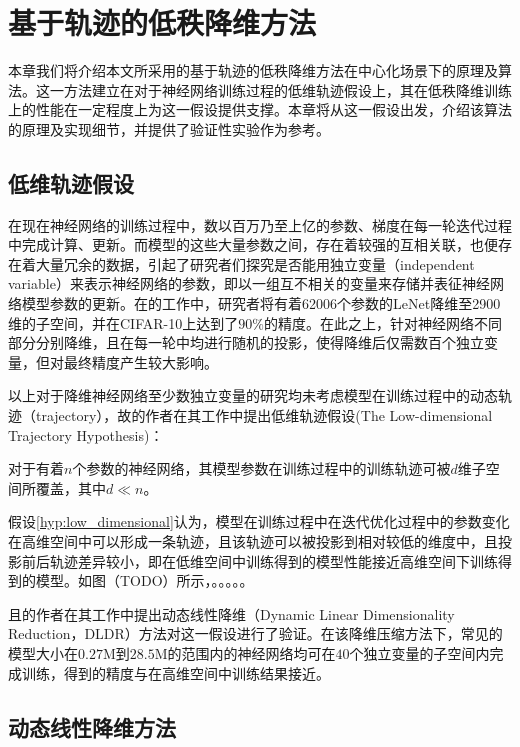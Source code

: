 \chapter{基于轨迹的低秩降维方法}

本章我们将介绍本文所采用的基于轨迹的低秩降维方法在中心化场景下的原理及算法。这一方法建立在对于神经网络训练过程的低维轨迹假设\cite{li2022low}上，其在低秩降维训练上的性能在一定程度上为这一假设提供支撑。本章将从这一假设出发，介绍该算法的原理及实现细节，并提供了验证性实验作为参考。

\section{低维轨迹假设}

在现在神经网络的训练过程中，数以百万乃至上亿的参数、梯度在每一轮迭代过程中完成计算、更新。而模型的这些大量参数之间，存在着较强的互相关联，也便存在着大量冗余的数据，引起了研究者们探究是否能用独立变量（independent variable）来表示神经网络的参数，即以一组互不相关的变量来存储并表征神经网络模型参数的更新。在\parencite{li2018measuring}的工作中，研究者将有着62006个参数的LeNet\cite{lecun2015lenet}降维至2900维的子空间，并在CIFAR-10\cite{krizhevsky2009learning}上达到了$90\%$的精度。在此之上，\parencite{gressmann2020improving}针对神经网络不同部分分别降维，且在每一轮中均进行随机的投影，使得降维后仅需数百个独立变量，但对最终精度产生较大影响。

以上对于降维神经网络至少数独立变量的研究均未考虑模型在训练过程中的动态轨迹（trajectory），故\parencite{li2022low}的作者在其工作中提出低维轨迹假设(The Low-dimensional Trajectory Hypothesis)：
\begin{hyp}[低维轨迹假设]\label{hyp:low_dimensional}
    对于有着$n$个参数的神经网络，其模型参数在训练过程中的训练轨迹可被$d$维子空间所覆盖，其中$d \ll n$。
\end{hyp}

假设\ref{hyp:low_dimensional}认为，模型在训练过程中在迭代优化过程中的参数变化在高维空间中可以形成一条轨迹，且该轨迹可以被投影到相对较低的维度中，且投影前后轨迹差异较小，即在低维空间中训练得到的模型性能接近高维空间下训练得到的模型。如图（TODO）所示，。。。。。


且\parencite{li2022low}的作者在其工作中提出动态线性降维（Dynamic Linear Dimensionality Reduction，DLDR）方法对这一假设进行了验证。在该降维压缩方法下，常见的模型大小在$0.27$M到$28.5$M的范围内的神经网络均可在$40$个独立变量的子空间内完成训练，得到的精度与在高维空间中训练结果接近。


\section{动态线性降维方法}

